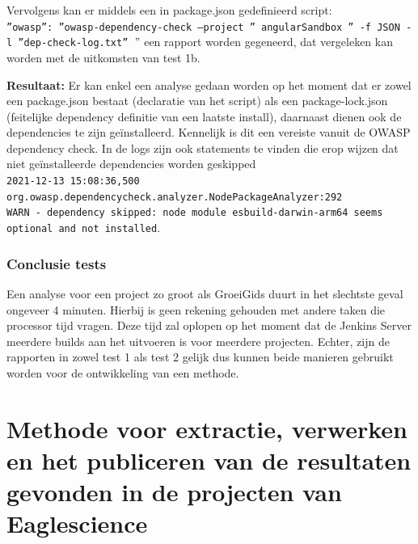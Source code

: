 Vervolgens kan er middels een in package.json gedefinieerd script:\\ \texttt{''owasp'': ''owasp-dependency-check --project '' angularSandbox '' -f JSON -l ''dep-check-log.txt'' $"$}%
een rapport worden gegeneerd, dat vergeleken kan worden met de uitkomsten van test 1b.

\textbf{Resultaat:}
Er kan enkel een analyse gedaan worden op het moment dat er zowel een package.json bestaat (declaratie van het script) als een package-lock.json (feitelijke dependency definitie van een laatste install), daarnaast dienen ook de dependencies te zijn geïnstalleerd. Kennelijk is dit een vereiste vanuit de OWASP dependency check. In de logs zijn ook statements te vinden die erop wijzen dat niet geïnstalleerde dependencies worden geskipped\\
\texttt{2021-12-13 15:08:36,500\\
org.owasp.dependencycheck.analyzer.NodePackageAnalyzer:292\\
WARN  - dependency skipped: node module esbuild-darwin-arm64 seems optional and not installed}.\\


\subsubsection{Conclusie tests}
Een analyse voor een project zo groot als GroeiGids duurt in het slechtste geval ongeveer 4 minuten. Hierbij is geen rekening gehouden met andere taken die processor tijd vragen. Deze tijd zal oplopen op het moment dat de Jenkins Server meerdere builds aan het uitvoeren is voor meerdere projecten. Echter, zijn de rapporten in zowel test 1 als test 2 gelijk dus kunnen beide manieren gebruikt worden voor de ontwikkeling van een methode.


\newpage


\section{Methode voor extractie, verwerken en het publiceren van de resultaten gevonden in de projecten van Eaglescience}\label{sec:methodesoupes}

